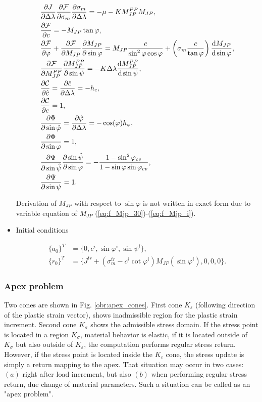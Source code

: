 \begin{itemize}
	\begin{align}
		&\pdv{J}{\Delta \lambda} \pdv{\mathcal{F}}{\sigma_m} \pdv{\sigma_m}{\Delta \lambda}  = -\mu - K M_{JP}^{PP}M_{JP},\\
		&\pdv{\mathcal{F}}{c} = -M_{JP}\tan\varphi,\\
		&\pdv{\mathcal{F}}{\varphi} + \pdv{\mathcal{F}}{M_{JP}} \pdv{M_{JP}}{\sin \varphi} = M_{JP} \dfrac{c}{\sin^2\varphi \cos\varphi} + \left( \sigma_m \dfrac{c}{\tan \varphi} \right) \dv{M_{JP}}{\sin \varphi}, \\
		&\pdv{\mathcal{F}}{M_{JP}^{PP}} \pdv{M_{JP}^{PP}}{\sin \psi} = -K \Delta \lambda \dv{M_{JP}^{PP}}{\sin \psi},\\
		&\pdv{\mathcal{C}}{\hat{c}} = \pdv{\hat{c}}{\Delta \lambda} = -h_c, \\
		&\pdv{\mathcal{C}}{c} = 1,\\
		&\pdv{\mathrm{\Phi}}{\sin \hat{\varphi}} = \pdv{\hat{\varphi}}{\Delta \lambda} = -\cos(\varphi) h_{\varphi},\\
		&\pdv{\mathrm{\Phi}}{\sin \varphi} = 1,\\
		&\pdv{\mathrm{\Psi}}{\sin \hat{\psi}} \pdv{\sin \hat{\psi}}{\sin \varphi} = -\dfrac{1 - \sin^2\varphi_{cv} }{1-\sin \varphi \sin \varphi_{cv}},\\
		&\pdv{\mathrm{\Psi}}{\sin \psi} = 1.
	\end{align}
	
	Derivation of $M_{JP}$ with respect to $\sin \varphi$ is not written in exact form due to variable equation of $M_{JP}$ (\ref{eq:f_Mjp_30})-(\ref{eq:f_Mjp_i}).
	
	\item Initial conditions
	
	\begin{align}
		\lbrace a_0 \rbrace^T &= \lbrace 0, c^i, \sin \varphi^i, \sin \psi^i \rbrace,\\
		\lbrace r_0 \rbrace^T &= \lbrace J^{tr} + (\sigma_m^{tr}-c^i\cot\varphi^i)M_{JP}(\sin\varphi^i), 0, 0, 0 \rbrace.
	\end{align}
	
\end{itemize} 

\subsubsection{Apex problem}
\indent

Two cones are shown in Fig. \ref{obr:apex_cones}. First cone $K_\varepsilon$ (following direction of the plastic strain vector), shows inadmissible region for the plastic strain increment. Second cone $K_\sigma$ shows the admissible stress domain. If the stress point is located in a region $K_\sigma$, material behavior is elastic, if it is located outside of $K_\sigma$ but also outside of $K_\varepsilon$, the computation  performs regular stress return. However, if the stress point is located inside the $K_\varepsilon$ cone, the stress update is simply a return mapping to the apex. That situation may occur in two cases: $(a)$ right after load increment, but also $(b)$ when performing regular stress return, due change of material parameters. Such a situation can be called as an "apex problem". 

